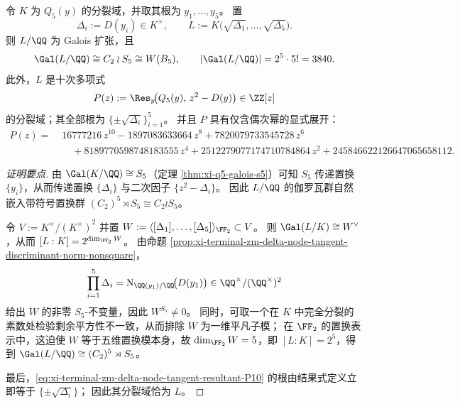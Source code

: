 \begin{theorem}[节点分裂方向的花环积伽罗瓦群与十次结果式模型]\label{thm:xi-terminal-zm-delta-node-tangent-wreath}
令 \(K\) 为 \(Q_5(y)\) 的分裂域，并取其根为 \(y_1,\dots,y_5\)。
置
\[
\Delta_i:=D(y_i)\in K^\times,
\qquad
L:=K\bigl(\sqrt{\Delta_1},\dots,\sqrt{\Delta_5}\bigr).
\]
则 \(L/\QQ\) 为 Galois 扩张，且
\[
\Gal(L/\QQ)\cong C_2\wr S_5\cong W(B_5),
\qquad
|\Gal(L/\QQ)|=2^5\cdot 5!=3840.
\]
此外，\(L\) 是十次多项式
\begin{equation}\label{eq:xi-terminal-zm-delta-node-tangent-resultant-P10}
P(z):=\Res_y\!\bigl(Q_5(y),\,z^2-D(y)\bigr)\in\ZZ[z]
\end{equation}
的分裂域；其全部根为 \(\{\pm\sqrt{\Delta_i}\}_{i=1}^5\)。
并且 \(P\) 具有仅含偶次幂的显式展开：
\[
\begin{aligned}
P(z)=\;&16777216\,z^{10}-1897083633664\,z^{8}+7820079733545728\,z^{6}\\
&\quad+8189770598748183555\,z^{4}+2512279077174710784864\,z^{2}
+245846622126647065658112.
\end{aligned}
\]
\end{theorem}
\begin{proof}[证明要点]
由 \(\Gal(K/\QQ)\cong S_5\)（定理 \ref{thm:xi-q5-galois-s5}）可知 \(S_5\) 传递置换 \(\{y_i\}\)，从而传递置换 \(\{\Delta_i\}\) 与二次因子 \(\{z^2-\Delta_i\}\)。
因此 \(L/\QQ\) 的伽罗瓦群自然嵌入带符号置换群 \((C_2)^5\rtimes S_5\cong C_2\wr S_5\)。
\par
令 \(V:=K^\times/(K^\times)^2\) 并置
\(
W:=\langle[\Delta_1],\dots,[\Delta_5]\rangle_{\FF_2}\subset V
\)。
则 \(\Gal(L/K)\cong W^\vee\)，从而 \([L:K]=2^{\dim_{\FF_2}W}\)。
由命题 \ref{prop:xi-terminal-zm-delta-node-tangent-discriminant-norm-nonsquare}，
\[
\prod_{i=1}^{5}\Delta_i
=\mathrm N_{\QQ(y_1)/\QQ}\!\bigl(D(y_1)\bigr)\in\QQ^\times/(\QQ^\times)^2
\]
给出 \(W\) 的非零 \(S_5\)-不变量，因此 \(W^{S_5}\neq 0\)。
同时，可取一个在 \(K\) 中完全分裂的素数处检验剩余平方性不一致，从而排除 \(W\) 为一维平凡子模；
在 \(\FF_2\) 的置换表示中，这迫使 \(W\) 等于五维置换模本身，故 \(\dim_{\FF_2}W=5\)，即 \([L:K]=2^5\)，得到
\(\Gal(L/\QQ)\cong (C_2)^5\rtimes S_5\)。
\par
最后，\eqref{eq:xi-terminal-zm-delta-node-tangent-resultant-P10} 的根由结果式定义立即等于 \(\{\pm\sqrt{\Delta_i}\}\)；
因此其分裂域恰为 \(L\)。
\end{proof}

